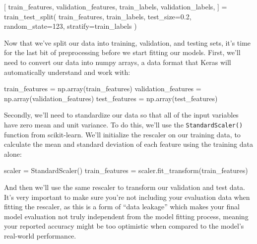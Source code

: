 \documentclass[
  letterpaper,
  DIV=11,
  numbers=noendperiod]{scrartcl}
\newenvironment{Shaded}{\begin{snugshade}}{\end{snugshade}}
\newcommand{\DecValTok}[1]{\textcolor[rgb]{0.68,0.00,0.00}{#1}}
\newcommand{\FloatTok}[1]{\textcolor[rgb]{0.68,0.00,0.00}{#1}}
\newcommand{\NormalTok}[1]{\textcolor[rgb]{0.00,0.23,0.31}{#1}}
\newcommand{\OperatorTok}[1]{\textcolor[rgb]{0.37,0.37,0.37}{#1}}
\begin{document}
\begin{Shaded}
\begin{Highlighting}[]
\NormalTok{[}
\NormalTok{    train\_features,}
\NormalTok{    validation\_features,}
\NormalTok{    train\_labels,}
\NormalTok{    validation\_labels,}
\NormalTok{] }\OperatorTok{=}\NormalTok{ train\_test\_split(}
\NormalTok{    train\_features, train\_labels, test\_size}\OperatorTok{=}\FloatTok{0.2}\NormalTok{, random\_state}\OperatorTok{=}\DecValTok{123}\NormalTok{, stratify}\OperatorTok{=}\NormalTok{train\_labels}
\NormalTok{)}
\end{Highlighting}
\end{Shaded}

Now that we've split our data into training, validation, and testing
sets, it's time for the last bit of preprocessing before we start
fitting our models. First, we'll need to convert our data into numpy
arrays, a data format that Keras will automatically understand and work
with:

\begin{Shaded}
\begin{Highlighting}[]
\NormalTok{train\_features }\OperatorTok{=}\NormalTok{ np.array(train\_features)}
\NormalTok{validation\_features }\OperatorTok{=}\NormalTok{ np.array(validation\_features)}
\NormalTok{test\_features }\OperatorTok{=}\NormalTok{ np.array(test\_features)}
\end{Highlighting}
\end{Shaded}

Secondly, we'll need to standardize our data so that all of the input
variables have zero mean and unit variance. To do this, we'll use the
\texttt{StandardScaler()} function from scikit-learn. We'll initialize
the rescaler on our training data, to calculate the mean and standard
deviation of each feature using the training data alone:

\begin{Shaded}
\begin{Highlighting}[]
\NormalTok{scaler }\OperatorTok{=}\NormalTok{ StandardScaler()}
\NormalTok{train\_features }\OperatorTok{=}\NormalTok{ scaler.fit\_transform(train\_features)}
\end{Highlighting}
\end{Shaded}

And then we'll use the same rescaler to transform our validation and
test data. It's very important to make sure you're not including your
evaluation data when fitting the rescaler, as this is a form of ``data
leakage'' which makes your final model evaluation not truly independent
from the model fitting process, meaning your reported accuracy might be
too optimistic when compared to the model's real-world performance.
\end{document}
